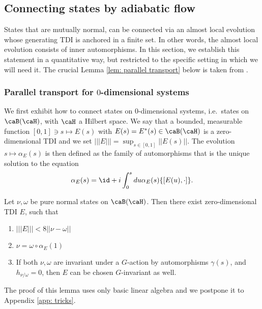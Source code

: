 \subsection{Connecting states by adiabatic flow}

States that are mutually normal, can be connected via an almost local evolution whose generating TDI is anchored in a finite set. In other words, the almost local evolution consists of inner automorphisms. In this section, we establish this statement in a quantitative way, but restricted to the specific setting in which we will need it.  The crucial Lemma \ref{lem: parallel transport} below is taken from \cite{kapustin2021classification}. 


\subsubsection{Parallel transport for $0$-dimensional systems}\label{Parallel in 0d}

We first exhibit how to connect states on $0$-dimensional systems, i.e.\ states on $\caB(\caH)$, with $\caH$ a Hilbert space. We say that a bounded, measurable function $[0,1]\ni s\mapsto E(s)$ with $E(s)=E^*(s)\in \caB(\caH) $ is a zero-dimensional TDI and we set $|||E|||=\sup_{s\in [0,1]} ||E(s)||$.
The evolution $s\mapsto \alpha_E(s)$ is then defined as the family of automorphisms that is the unique solution to the equation 
$$\alpha_E(s)=\id+i\int_0^sdu \alpha_E(s)\{[E(u),\cdot]\}.$$ 
\begin{lemma}\label{lem: parallel transport simple}
	Let $\nu,\omega$ be pure normal states on $\caB(\caH)$.
	Then there exist zero-dimensional TDI $E$, such that 
	\begin{enumerate}
		\item   $|||E||| < 8 || \nu-\omega ||$
		\item $\nu = \omega\circ \alpha_E(1)$
		\item  If both $\nu,\omega$ are invariant under a $G$-action by automorphisms $\gamma(s)$, and $h_{\nu/\omega}=0$, then $E$ can be chosen $G$-invariant as well.
	\end{enumerate}
\end{lemma}
The proof of this lemma uses only basic linear algebra and we postpone it to Appendix \ref{app: tricks}.



